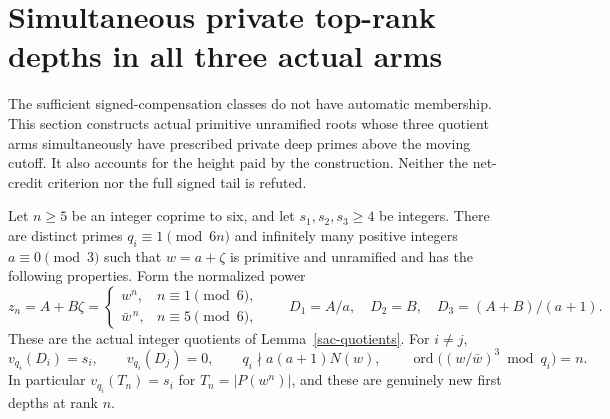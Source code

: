 \section{Simultaneous private top-rank depths in all three actual arms}
\label{td-section}

The sufficient signed-compensation classes do not have automatic
membership. This section constructs actual primitive unramified roots
whose three quotient arms simultaneously have prescribed private deep
primes above the moving cutoff. It also accounts for the height paid by
the construction. Neither the net-credit criterion nor the full signed
tail is refuted.

\begin{theorem}\label{td-three-depths}
Let $n\ge5$ be an integer coprime to six, and let $s_1,s_2,s_3\ge4$
be integers. There are distinct primes $q_i\equiv1\pmod{6n}$ and
infinitely many positive integers $a\equiv0\pmod3$ such that
$w=a+\zeta$ is primitive and unramified and has the following properties.
Form the normalized power
\[
 z_n=A+B\zeta=
 \begin{cases}w^n,&n\equiv1\pmod6,\\
 \bar w^{\,n},&n\equiv5\pmod6,
 \end{cases}
 \qquad
 D_1=A/a,\quad D_2=B,\quad D_3=(A+B)/(a+1).
\]
These are the actual integer quotients of Lemma~\ref{sac-quotients}.
For $i\ne j$,
\begin{equation}\label{td-depths}
 v_{q_i}(D_i)=s_i,\qquad v_{q_i}(D_j)=0,\qquad
 q_i\nmid a(a+1)N(w),\qquad
 \operatorname{ord}\bigl((w/\bar w)^3\bmod q_i\bigr)=n.
\end{equation}
In particular $v_{q_i}(T_n)=s_i$ for $T_n=|P(w^n)|$, and these
are genuinely new first depths at rank $n$.
\end{theorem}

